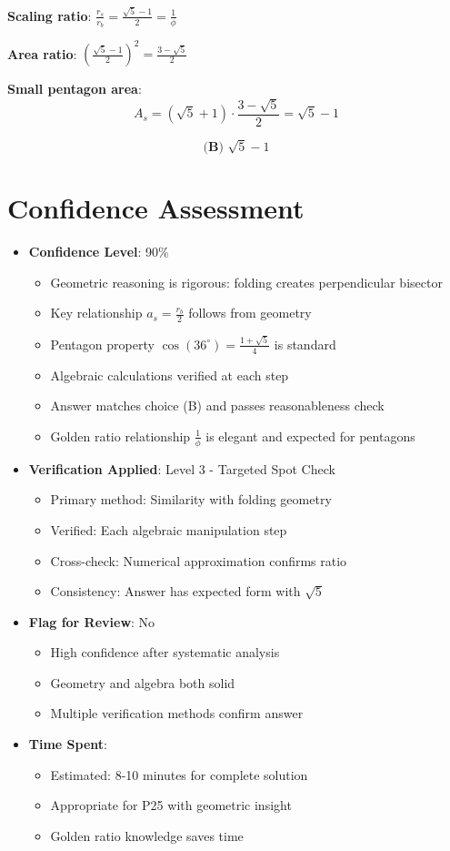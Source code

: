 \documentclass[12pt]{article}
\begin{document}
\textbf{Scaling ratio}: $\frac{r_s}{r_b} = \frac{\sqrt{5}-1}{2} = \frac{1}{\phi}$

\textbf{Area ratio}: $\left(\frac{\sqrt{5}-1}{2}\right)^2 = \frac{3-\sqrt{5}}{2}$

\textbf{Small pentagon area}: 
$$A_s = (\sqrt{5}+1) \cdot \frac{3-\sqrt{5}}{2} = \sqrt{5}-1$$

$$\boxed{\textbf{(B) } \sqrt{5}-1}$$

\section*{Confidence Assessment}
\begin{itemize}[leftmargin=*]
    \item \textbf{Confidence Level}: 90\% 
    \begin{itemize}
        \item Geometric reasoning is rigorous: folding creates perpendicular bisector
        \item Key relationship $a_s = \frac{r_b}{2}$ follows from geometry
        \item Pentagon property $\cos(36^\circ) = \frac{1+\sqrt{5}}{4}$ is standard
        \item Algebraic calculations verified at each step
        \item Answer matches choice (B) and passes reasonableness check
        \item Golden ratio relationship $\frac{1}{\phi}$ is elegant and expected for pentagons
    \end{itemize}
    \item \textbf{Verification Applied}: Level 3 - Targeted Spot Check
    \begin{itemize}
        \item Primary method: Similarity with folding geometry
        \item Verified: Each algebraic manipulation step
        \item Cross-check: Numerical approximation confirms ratio
        \item Consistency: Answer has expected form with $\sqrt{5}$
    \end{itemize}
    \item \textbf{Flag for Review}: No
    \begin{itemize}
        \item High confidence after systematic analysis
        \item Geometry and algebra both solid
        \item Multiple verification methods confirm answer
    \end{itemize}
    \item \textbf{Time Spent}: 
    \begin{itemize}
        \item Estimated: 8-10 minutes for complete solution
        \item Appropriate for P25 with geometric insight
        \item Golden ratio knowledge saves time
    \end{itemize}
\end{itemize}
\end{document}
